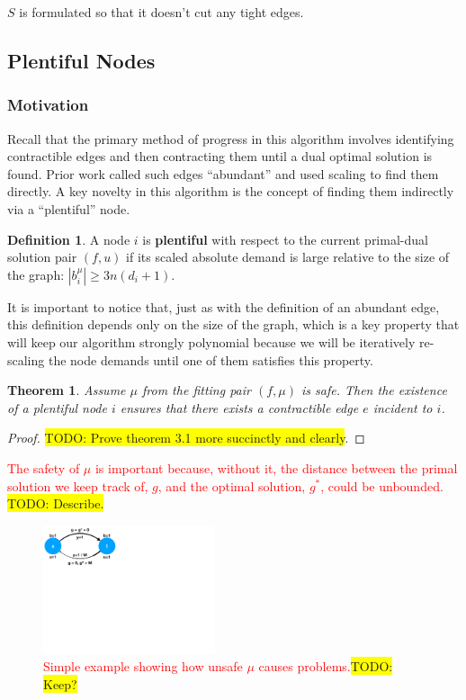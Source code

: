 \documentclass[11pt]{article}
\newtheorem{theorem}{Theorem}[section]
\theoremstyle{definition}
\newtheorem{definition}{Definition}[section]
\theoremstyle{definition}
\newcommand{\rewrite}[1]{\textcolor{red}{#1}}
\newcommand{\todo}[1]{\colorbox{yellow}{TODO: #1}}
\begin{document}
$S$ is formulated so that it doesn't cut any tight edges. 
\subsection{Plentiful Nodes}

\subsubsection{Motivation}

Recall that the primary method of progress in this algorithm involves
identifying contractible edges and then contracting them until a dual optimal
solution is found. Prior work called such edges ``abundant'' and used scaling to
find them directly. A key novelty in this algorithm is the concept of finding
them indirectly via a ``plentiful'' node. 
\begin{definition}
A node $i$ is \textbf{plentiful} with respect
to the current primal-dual solution pair $(f,u)$ if its scaled absolute
demand is large relative to the size of the graph: $|b_i^{\mu}| \ge 3n(d_i + 1)$.
\end{definition}

It is important to notice that, just as with the definition of an abundant  edge,
this definition depends only on the size of the graph, which is a key property
that will keep our algorithm strongly polynomial because we will be iteratively
re-scaling the node demands until one of them satisfies this property.

\begin{theorem} Assume $\mu$ from the fitting pair $(f,\mu)$ is safe.
Then the existence of a plentiful node $i$ ensures
that there exists a contractible edge $e$ incident to $i$.
\end{theorem}
\begin{proof}
\todo{Prove theorem 3.1 more succinctly and clearly}.
\end{proof}

\rewrite{The safety of $\mu$ is important because, without it, the distance between
the primal solution we keep track of, $g$, and the optimal solution, $g^*$, could
be unbounded.} \todo{Describe.}

\begin{figure}[h]
\centering
\includegraphics[width=0.45\textwidth]{figs/unsafe.pdf}
\caption{
\label{fig:unsafe}
\rewrite{Simple example showing how unsafe $\mu$ causes problems.}\todo{Keep?}
}
\end{figure}
\end{document}
